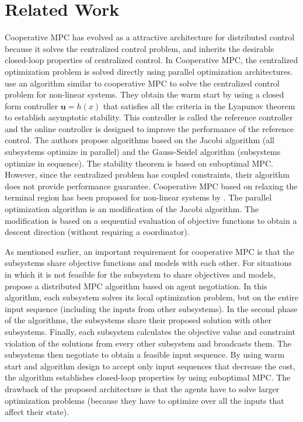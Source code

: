 \documentclass[10pt]{article}
\newcommand{\bu}{\mathbf{u}}
\theoremstyle{definition}
\begin{document}
\section{Related Work}
\label{sec:related}
Cooperative MPC has evolved as a attractive architecture for
distributed control because it solves the centralized control
problem, and inherits the desirable closed-loop properties of
centralized control. 
In Cooperative MPC, the centralized optimization
problem is solved directly using parallel optimization
architectures. \citet{liu:chen:pena:christofides:2010}  use an algorithm similar to cooperative MPC to solve the centralized control problem for non-linear systems. They obtain the warm start by using a closed form controller $\bu = h(x)$ that satisfies all the criteria in the Lyapunov theorem to establish asymptotic stability. This controller is called the reference controller and the online controller is designed to improve the performance of  the reference control. The authors propose algorithms based on the  Jacobi algorithm (all subsystems optimize in parallel) and the Gauss-Seidel algorithm (subsystems optimize in sequence). The stability theorem is based on suboptimal MPC. However, since the centralized problem has coupled constraints, their algorithm does not provide performance guarantee. Cooperative MPC based on relaxing the terminal region has been proposed for non-linear systems by \citet{stewart:wright:rawlings:2011}. The parallel optimization algorithm is an modification of the Jacobi algorithm. The modification is based on a sequential evaluation of objective functions to obtain a descent direction (without requiring a coordinator).

As mentioned earlier, an important requirement for cooperative MPC is that the subsystems share objective functions and models with each other. For situations in which it is not feasible for the subsystem to share objectives and models, 
 \citet{maestre:pena:camacho:alamo:2011} propose a distributed MPC algorithm  based on agent negotiation. In this algorithm, each subsystem solves its local optimization problem, but on the entire input sequence (including the inputs from other subsystems). In the second phase of the algorithms, the subsystems share their proposed solution with other subsystems. Finally, each subsystem calculates the objective value and constraint violation of the solutions from every other subsystem and broadcasts them. The subsystems then negotiate to obtain a feasible input sequence. By using warm start and algorithm design to accept only input sequences that decrease the cost, the algorithm establishes closed-loop properties by using suboptimal MPC. 
The drawback of the proposed architecture is 
that  the agents have to solve larger optimization problems
(because they have to optimize over all the inputs that affect their state).
\end{document}
